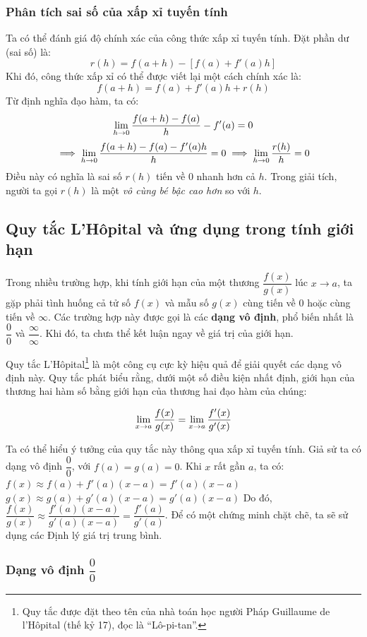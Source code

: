 \subsubsection*{Phân tích sai số của xấp xỉ tuyến tính}
Ta có thể đánh giá độ chính xác của công thức xấp xỉ tuyến tính. Đặt phần dư (sai số) là:
$$ r(h) = f(a+h) - [f(a) + f'(a)h] $$
Khi đó, công thức xấp xỉ có thể được viết lại một cách chính xác là:
$$ f(a+h) = f(a) + f'(a)h + r(h) $$
Từ định nghĩa đạo hàm, ta có:
$$ \lim\limits_{h \to 0} \dfrac{f(a+h) - f(a)}{h} - f'(a) = 0 $$
$$ \implies \lim\limits_{h \to 0} \dfrac{f(a+h) - f(a) - f'(a)h}{h} = 0 \implies \lim\limits_{h \to 0} \dfrac{r(h)}{h} = 0 $$
Điều này có nghĩa là sai số $r(h)$ tiến về $0$ nhanh hơn cả $h$. Trong giải tích, người ta gọi $r(h)$ là một \textit{vô cùng bé bậc cao hơn} so với $h$.

\subsection{Quy tắc L'Hôpital và ứng dụng trong tính giới hạn}
\label{sec:lhopital-rule}

Trong nhiều trường hợp, khi tính giới hạn của một thương $\dfrac{f(x)}{g(x)}$ lúc $x \to a$, ta gặp phải tình huống cả tử số $f(x)$ và mẫu số $g(x)$ cùng tiến về $0$ hoặc cùng tiến về $\infty$. Các trường hợp này được gọi là các \textbf{dạng vô định}, phổ biến nhất là $\dfrac{0}{0}$ và $\dfrac{\infty}{\infty}$. Khi đó, ta chưa thể kết luận ngay về giá trị của giới hạn.

Quy tắc L'Hôpital\footnote{Quy tắc được đặt theo tên của nhà toán học người Pháp Guillaume de l'Hôpital (thế kỷ 17), đọc là ``Lô-pi-tan''.} là một công cụ cực kỳ hiệu quả để giải quyết các dạng vô định này. Quy tắc phát biểu rằng, dưới một số điều kiện nhất định, giới hạn của thương hai hàm số bằng giới hạn của thương hai đạo hàm của chúng:
\begin{importantbox}
    \[\lim\limits_{x \to a} \dfrac{f(x)}{g(x)} = \lim\limits_{x \to a} \dfrac{f'(x)}{g'(x)}\]
\end{importantbox}

Ta có thể hiểu ý tưởng của quy tắc này thông qua xấp xỉ tuyến tính. Giả sử ta có dạng vô định $\dfrac{0}{0}$, với $f(a) = g(a) = 0$. Khi $x$ rất gần $a$, ta có:
$ f(x) \approx f(a) + f'(a)(x-a) = f'(a)(x-a) $
$ g(x) \approx g(a) + g'(a)(x-a) = g'(a)(x-a) $
Do đó, $ \dfrac{f(x)}{g(x)} \approx \dfrac{f'(a)(x-a)}{g'(a)(x-a)} = \dfrac{f'(a)}{g'(a)} $.
Để có một chứng minh chặt chẽ, ta sẽ sử dụng các Định lý giá trị trung bình.

\subsubsection*{Dạng vô định \texorpdfstring{$\dfrac{0}{0}$}{0/0}}

